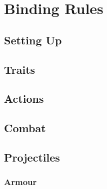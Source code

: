 \section*{Binding Rules}

\begin{multicols}{2}

\subsection*{Setting Up}



\subsection*{Traits}







\physicalSkillChart

\subsection*{Actions}








\subsection*{Combat}





\commonWeaponsChart

\subsection*{Projectiles}



\subsubsection*{Armour}


\end{multicols}
